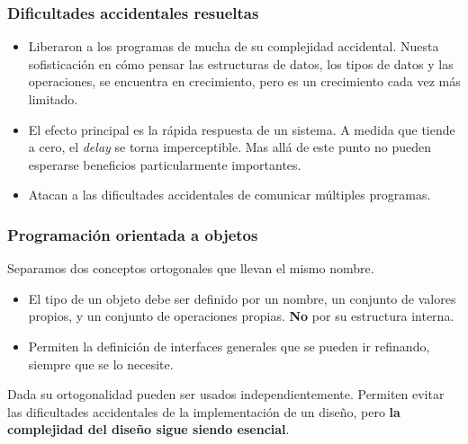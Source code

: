 \documentclass{beamer}
\begin{document}
\begin{frame}[fragile]
  \frametitle{Dificultades accidentales resueltas}

  \begin{itemize}
    \item[Lenguajes de alto nivel]
      Liberaron a los programas de mucha de su complejidad accidental.
      Nuesta sofisticaci\'on en c\'omo pensar las estructuras de datos, los tipos
      de datos y las operaciones, se encuentra en crecimiento, pero es un crecimiento
      cada vez m\'as limitado.
    \item[Tiempo compartido]
      El efecto principal es la r\'apida respuesta de un sistema. A medida que
      tiende a cero, el \textit{delay} se torna imperceptible. Mas all\'a de
      este punto no pueden esperarse beneficios particularmente importantes.
    \item[Ambientes de programaci\'on unificados]
      Atacan a las dificultades accidentales de comunicar m\'ultiples programas.
  \end{itemize}
\end{frame}


%
%


\begin{frame}[fragile]
  \frametitle{Programaci\'on orientada a objetos}
  Separamos dos conceptos ortogonales que llevan el mismo nombre.
  \begin{itemize}
    \item[Tipos abstractos de datos] El tipo de un objeto debe ser
      definido por un nombre, un conjunto de valores propios, y un conjunto
      de operaciones propias. \textbf{No} por su estructura interna.
    \item[Tipos jer\'arquicos] Permiten la definici\'on de interfaces generales
      que se pueden ir refinando, siempre que se lo necesite.
  \end{itemize}

  Dada su ortogonalidad pueden ser usados independientemente.
  Permiten evitar las dificultades accidentales de la implementaci\'on de un
  dise\~no, pero \textbf{la complejidad del dise\~no sigue siendo esencial}.
\end{frame}
\end{document}
